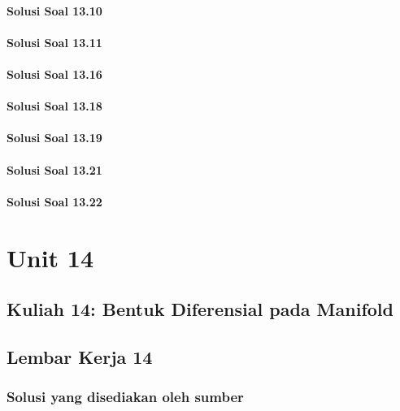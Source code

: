 \documentclass[11pt,a4paper,oneside]{book}
\begin{document}
\subsection*{Solusi Soal 13.10}

\subsection*{Solusi Soal 13.11}

\subsection*{Solusi Soal 13.16}

\subsection*{Solusi Soal 13.18}

\subsection*{Solusi Soal 13.19}

\subsection*{Solusi Soal 13.21}

\subsection*{Solusi Soal 13.22}


\part{Unit 14}
\chapter[Kuliah 14]{Kuliah 14: Bentuk Diferensial pada Manifold}


\chapter{Lembar Kerja 14}


\section*{Solusi yang disediakan oleh sumber}
\end{document}
